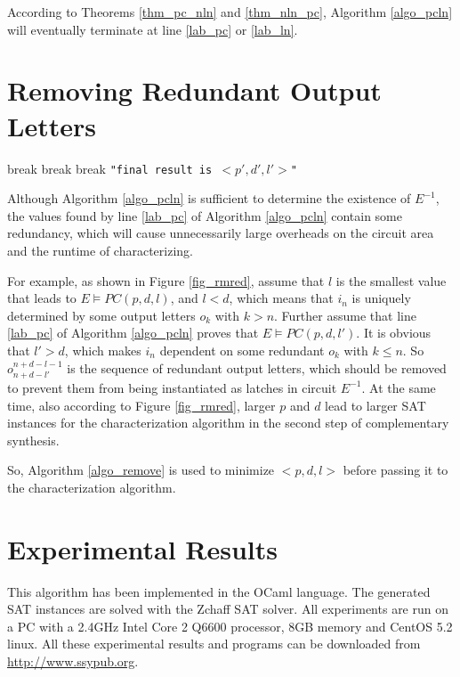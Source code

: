 \documentclass[journal]{IEEEtran}
\begin{document}
According to Theorems \ref{thm_pc_nln} and \ref{thm_nln_pc},
Algorithm \ref{algo_pcln} will eventually terminate at line \ref{lab_pc} or \ref{lab_ln}.

\section{Removing Redundant Output Letters}\label{sec_rmred}
\begin{algorithm}
\caption{$RemoveRedundancy(p,d,l)$}
\label{algo_remove}
\begin{algorithmic}[1]
    \STATE break
  \ENDIF
\ENDFOR
{}
    \STATE break
  \ENDIF
\ENDFOR
{}
    \STATE break
  \ENDIF
\ENDFOR
\PRINT \texttt{"final result is $<p',d',l'>$"}
\end{algorithmic}
\end{algorithm}

Although Algorithm \ref{algo_pcln} is sufficient to determine the existence of $E^{-1}$,
the values found by line \ref{lab_pc} of Algorithm \ref{algo_pcln} contain some redundancy,
which will cause unnecessarily large overheads on the circuit area and the runtime of characterizing.

For example,
as shown in Figure \ref{fig_rmred},
assume that $l$ is the smallest value that leads to $E\vDash PC(p,d,l)$,
and $l<d$,
which means that $i_n$ is uniquely determined by some output letters $o_k$ with $k>n$.
Further assume that line \ref{lab_pc} of Algorithm \ref{algo_pcln} proves that $E\vDash PC(p,d,l')$.
It is obvious that $l'>d$,
which makes $i_n$ dependent on some redundant $o_k$ with $k\le n$.
So $o_{n+d-l'}^{n+d-l-1}$ is the sequence of redundant output letters,
which should be removed to prevent them from being instantiated as latches in circuit $E^{-1}$.
At the same time,
also according to Figure \ref{fig_rmred},
larger $p$ and $d$ lead to larger SAT instances for the characterization algorithm in the second step of complementary synthesis.

So,
Algorithm \ref{algo_remove} is used to minimize $<p,d,l>$ before passing it to the characterization algorithm.


\section{Experimental Results}\label{sec_exp}
This algorithm has been implemented in the OCaml language.
The generated SAT instances are solved with the Zchaff SAT solver\cite{CHAFF}.
All experiments are run on a PC with a 2.4GHz Intel Core 2 Q6600 processor, 8GB memory and CentOS 5.2 linux.
All these experimental results and programs can be downloaded from \url{http://www.ssypub.org}.
\end{document}
